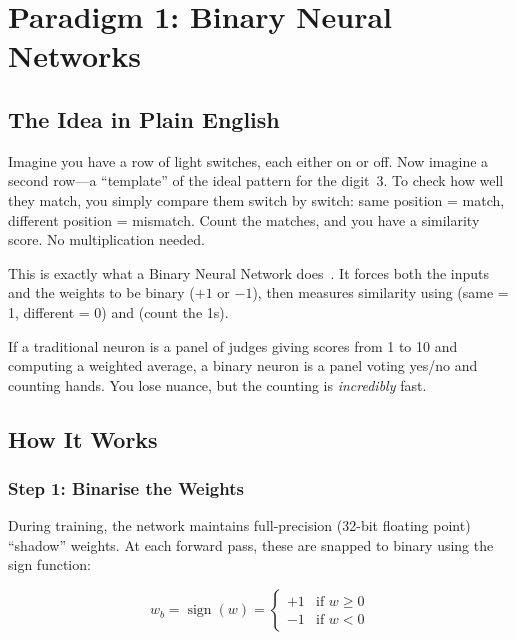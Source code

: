 \section{Paradigm 1: Binary Neural Networks}
\label{sec:bnn}

\subsection{The Idea in Plain English}

Imagine you have a row of light switches, each either on or off. Now
imagine a second row---a ``template'' of the ideal pattern for the
digit~3. To check how well they match, you simply compare them
switch by switch: same position = match, different position = mismatch.
Count the matches, and you have a similarity score. No multiplication
needed.

This is exactly what a Binary Neural Network does~\cite{courbariaux2016bnn}. It forces both the
inputs and the weights to be binary ($+1$ or $-1$), then measures
similarity using  (same = 1, different = 0) and
 (count the 1s).

\begin{analogy}
If a traditional neuron is a panel of judges giving scores from 1 to
10 and computing a weighted average, a binary neuron is a panel voting
yes/no and counting hands. You lose nuance, but the counting is
\emph{incredibly} fast.
\end{analogy}

\subsection{How It Works}

\subsubsection{Step 1: Binarise the Weights}

During training, the network maintains full-precision (32-bit floating
point) ``shadow'' weights. At each forward pass, these are snapped to
binary using the sign function:

\begin{equation}
  w_b = \operatorname{sign}(w) =
  \begin{cases}
    +1 & \text{if } w \geq 0 \\
    -1 & \text{if } w < 0
  \end{cases}
  \label{eq:sign}
\end{equation}

